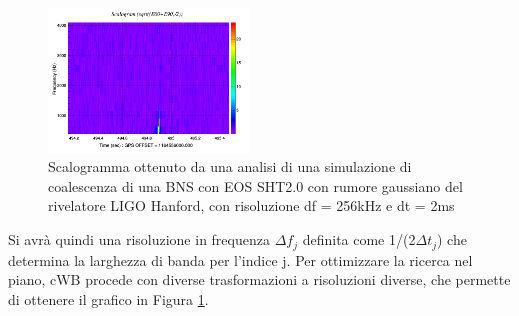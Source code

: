 \begin{figure}
	\vspace{-15pt}
	\begin{center}
		\includegraphics[width=0.475\textwidth]{figures/Capitolo_3/L1_scalogram_0.png}
	\end{center}
	\vspace{-5pt}
	\caption{Scalogramma ottenuto da una analisi di una simulazione di coalescenza di una BNS con EOS SHT2.0 con rumore gaussiano del rivelatore LIGO Hanford, con risoluzione df = 256kHz e dt = 2ms}
	\label{fig:scalogram_example}
	\vspace{-40pt}
\end{figure}
Si avrà quindi una risoluzione in frequenza $\Delta f_j$ definita come 1/(2$\Delta t_j$) che determina la larghezza di banda per l'indice j. Per ottimizzare la ricerca nel piano, cWB procede con diverse trasformazioni a risoluzioni diverse, che permette di ottenere il grafico in Figura \ref{fig:scalogram_example}\cite{Klimenko_2008}.
%

